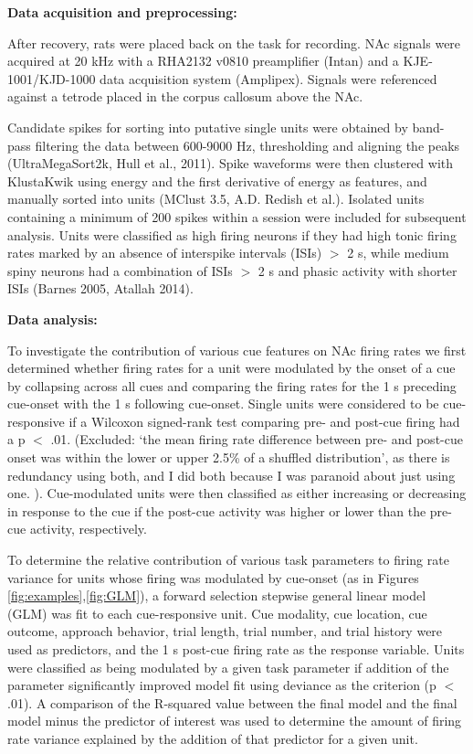\documentclass[11pt]{article}
\begin{document}
{\bf Data acquisition and preprocessing:}

After recovery, rats were placed back on the task for recording. NAc signals were acquired at 20 kHz with a RHA2132 v0810 preamplifier (Intan) and a KJE-1001/KJD-1000 data acquisition system (Amplipex). Signals were referenced against a tetrode placed in the corpus callosum above the NAc.

Candidate spikes for sorting into putative single units were obtained by band-pass filtering the data between 600-9000 Hz, thresholding and aligning the peaks (UltraMegaSort2k, Hull et al., 2011). Spike waveforms were then clustered with KlustaKwik using energy and the first derivative of energy as features, and manually sorted into units (MClust 3.5, A.D. Redish et al.). Isolated units containing a minimum of 200 spikes within a session were included for subsequent analysis. Units were classified as high firing neurons if they had high tonic firing rates marked by an absence of interspike intervals (ISIs) $>$ 2 s, while medium spiny neurons had a combination of ISIs $>$ 2 s and phasic activity with shorter ISIs (Barnes 2005, Atallah 2014). 

{\bf Data analysis:}

To investigate the contribution of various cue features on NAc firing rates we first determined whether firing rates for a unit were modulated by the onset of a cue by collapsing across all cues and comparing the firing rates for the 1 s preceding cue-onset with the 1 s following cue-onset. Single units were considered to be cue-responsive if a Wilcoxon signed-rank test comparing pre- and post-cue firing had a p $<$ .01. (Excluded: ‘the mean firing rate difference between pre- and post-cue onset was within the lower or upper 2.5\% of a shuffled distribution’, as there is redundancy using both, and I did both because I was paranoid about just using one. ). Cue-modulated units were then classified as either increasing or decreasing in response to the cue if the post-cue activity was higher or lower than the pre-cue activity, respectively. 

To determine the relative contribution of various task parameters to firing rate variance for units whose firing was modulated by cue-onset (as in Figures \ref{fig:examples},\ref{fig:GLM}), a forward selection stepwise general linear model (GLM) was fit to each cue-responsive unit. Cue modality, cue location, cue outcome, approach behavior, trial length, trial number, and trial history were used as predictors, and the 1 s post-cue firing rate as the response variable. Units were classified as being modulated by a given task parameter if addition of the parameter significantly improved model fit using deviance as the criterion (p $<$ .01). A comparison of the R-squared value between the final model and the final model minus the predictor of interest was used to determine the amount of firing rate variance explained by the addition of that predictor for a given unit. 
\end{document}

